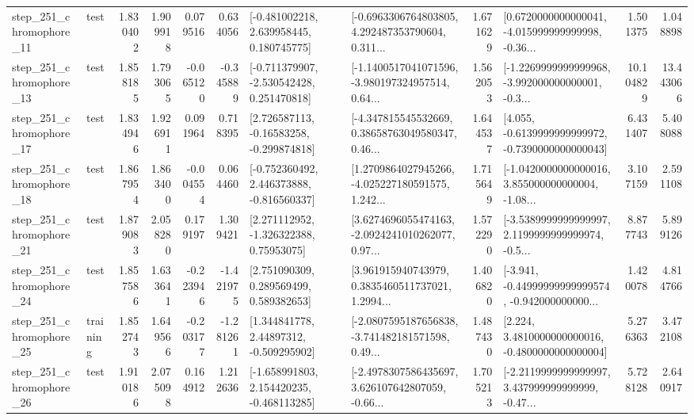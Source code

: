 \begin{tabular}{llrrrrllrlrr}
  step\_251\_chromophore\_11 &      test &      1.830402 &    1.909918 &      0.079516 &  0.634056 &    [-0.481002218, 2.639958445, 0.180745775] &  [-0.6963306764803805, 4.292487353790604, 0.311... &       1.671629 &  [0.6720000000000041, -4.015999999999998, -0.36... &            1.501375 &          1.048898 \\
  step\_251\_chromophore\_13 &      test &      1.858185 &    1.793065 &     -0.065120 & -0.345889 &   [-0.711379907, -2.530542428, 0.251470818] &  [-1.1400517041071596, -3.980197324957514, 0.64... &       1.562053 &  [-1.2269999999999968, -3.992000000000001, -0.3... &           10.104829 &         13.443066 \\
  step\_251\_chromophore\_17 &      test &      1.834946 &    1.926911 &      0.091964 &  0.718395 &    [2.726587113, -0.16583258, -0.299874818] &  [-4.347815545532669, 0.38658763049580347, 0.46... &       1.644537 &  [4.055, -0.6139999999999972, -0.7390000000000043] &            6.431407 &          5.408088 \\
  step\_251\_chromophore\_18 &      test &      1.867954 &    1.863400 &     -0.004554 &  0.064460 &   [-0.752360492, 2.446373888, -0.816560337] &  [1.2709864027945266, -4.025227180591575, 1.242... &       1.715649 &  [-1.0420000000000016, 3.855000000000004, -1.08... &            3.107159 &          2.591108 \\
  step\_251\_chromophore\_21 &      test &      1.879083 &    2.058280 &      0.179197 &  1.309421 &     [2.271112952, -1.326322388, 0.75953075] &  [3.6274696055474163, -2.0924241010262077, 0.97... &       1.572290 &  [-3.5389999999999997, 2.1199999999999974, -0.5... &            8.877743 &          5.899126 \\
  step\_251\_chromophore\_24 &      test &      1.857586 &    1.633641 &     -0.223946 & -1.421975 &     [2.751090309, 0.289569499, 0.589382653] &  [3.961915940743979, 0.3835460511737021, 1.2994... &       1.406820 &  [-3.941, -0.44999999999999574, -0.942000000000... &            1.420078 &          4.814766 \\
  step\_251\_chromophore\_25 &  training &      1.852743 &    1.649566 &     -0.203177 & -1.281261 &     [1.344841778, 2.44897312, -0.509295902] &  [-2.0807595187656838, -3.741482181571598, 0.49... &       1.487430 &   [2.224, 3.4810000000000016, -0.4800000000000004] &            5.276363 &          3.472108 \\
  step\_251\_chromophore\_26 &      test &      1.910186 &    2.075098 &      0.164912 &  1.212636 &   [-1.658991803, 2.154420235, -0.468113285] &  [-2.4978307586435697, 3.626107642807059, -0.66... &       1.705213 &  [-2.2119999999999997, 3.437999999999999, -0.47... &            5.728128 &          2.640917 \\

\end{tabular}
